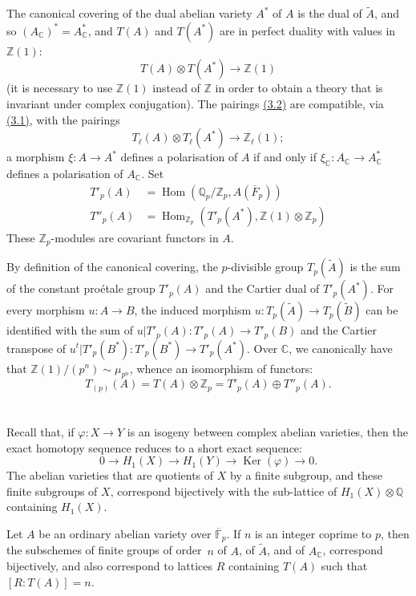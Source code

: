 \documentclass{article}
\newcommand{\FF}{\mathbb{F}}
\newcommand{\ZZ}{\mathbb{Z}}
\newcommand{\QQ}{\mathbb{Q}}
\newcommand{\CC}{\mathbb{C}}
\DeclareMathOperator{\Hom}{Hom}
\DeclareMathOperator{\Ker}{Ker}
\newcommand{\oldpage}[1]{\marginpar{\footnotesize$\Big\vert$ \textit{p.~#1}}}
\begin{document}
The canonical covering of the dual abelian variety $A^*$ of $A$ is the dual of $\widetilde{A}$, and so $(A_\CC)^*=A_\CC^*$, and $T(A)$ and $T(A^*)$ are in perfect duality with values in $\ZZ(1)$:
\[
\label{3.2}
  T(A)\otimes T(A^*) \to \ZZ(1)
\tag{3.2}
\]
(it is necessary to use $\ZZ(1)$ instead of $\ZZ$ in order to obtain a theory that is invariant under complex conjugation).
The pairings \hyperref[3.2]{(3.2)} are compatible, via \hyperref[3.1]{(3.1)}, with the pairings
\[
  T_\ell(A)\otimes T_\ell(A^*) \to \ZZ_\ell(1);
\]
a morphism $\xi\colon A\to A^*$ defines a polarisation of $A$ if and only if $\xi_\CC\colon A_\CC\to A_\CC^*$ defines a polarisation of $A_\CC$.
Set
\[
  \begin{aligned}
    T'_p(A) &= \Hom(\QQ_p/\ZZ_p,A(\overline{F}_p))
  \\T''_p(A) &= \Hom_{\ZZ_p}(T'_p(A^*),\ZZ(1)\otimes\ZZ_p)
  \end{aligned}
\]
These $\ZZ_p$-modules are covariant functors in $A$.

By definition of the canonical covering, the $p$-divisible group $T_p(\widetilde{A})$ is the sum of the constant pro\'{e}tale group $T'_p(A)$ and the Cartier dual of $T'_p(A^*)$.
For every morphism $u\colon A\to B$, the induced morphism $u\colon T_p(\widetilde{A})\to T_p(\widetilde{B})$ can be identified with the sum of $u|T'_p(A)\colon T'_p(A)\to T'_p(B)$ and the Cartier transpose of $u^t|T'_p(B^*)\colon T'_p(B^*)\to T'_p(A^*)$.
Over $\CC$, we canonically have that $\ZZ(1)/(p^n)\sim\mu_{p^n}$, whence an isomorphism of functors:
\[
\label{3.3}
  T_{(p)}(A) = T(A)\otimes\ZZ_p = T'_p(A)\oplus T''_p(A).
\tag{3.3}
\]


\section{}
\label{4}
Recall that, if $\varphi\colon X\to Y$ is an isogeny between complex abelian varieties, then the exact homotopy sequence reduces to a short exact sequence:
\[
  0 \to H_1(X) \to H_1(Y) \to \Ker(\varphi) \to 0.
\]
\oldpage{240}
The abelian varieties that are quotients of $X$ by a finite subgroup, and these finite subgroups of $X$, correspond bijectively with the sub-lattice of $H_1(X)\otimes\QQ$ containing $H_1(X)$.

Let $A$ be an ordinary abelian variety over $\overline{\FF}_p$.
If $n$ is an integer coprime to $p$, then the subschemes of finite groups of order~$n$ of $A$, of $\widetilde{A}$, and of $A_\CC$, correspond bijectively, and also correspond to lattices $R$ containing $T(A)$ such that $[R:T(A)]=n$.
\end{document}
